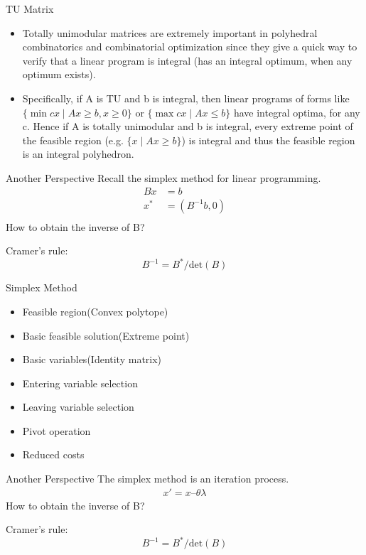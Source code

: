     \begin{frame}{TU Matrix}
      \begin{itemize}
        \item Totally unimodular matrices are extremely important in polyhedral combinatorics and combinatorial optimization since they give a quick way to verify that a linear program is integral (has an integral optimum, when any optimum exists).
        \item Specifically, if A is TU and b is integral, then linear programs of forms like $ \{\min cx\mid Ax\geq b,x\geq 0\} $ or $ \{\max cx\mid Ax\leq b\} $ have integral optima, for any c. Hence if A is totally unimodular and b is integral, every extreme point of the feasible region (e.g. $ \{x\mid Ax\geq b\} $) is integral and thus the feasible region is an integral polyhedron.
      \end{itemize}
    \end{frame}

    \begin{frame}{Another Perspective}
      Recall the simplex method for linear programming.
      \begin{equation*}
        \begin{align}
        Bx &= b \\
        x^* &= (B^{-1}b,0) \\
        \end{align}
      \end{equation*}
      How to obtain the inverse of B?

      Cramer's rule: \[B^{-1} = B^*/\text{det}(B)\]
    \end{frame}

    \begin{frame}{Simplex Method}
      \begin{itemize}
        \item Feasible region(Convex polytope)
        \item Basic feasible solution(Extreme point)
        \item Basic variables(Identity matrix)
        \item Entering variable selection
        \item Leaving variable selection
        \item Pivot operation
        \item Reduced costs
      \end{itemize}
    \end{frame}

    \begin{frame}{Another Perspective}
      The simplex method is an iteration process.
      \begin{equation*}
        \begin{align}
        x' = x – \theta\lambda
        \end{align}
      \end{equation*}
      How to obtain the inverse of B?
      \begin{block}
        {Cramer's rule:}
        {\centering\[B^{-1} = B^*/\text{det}(B)\]}
      \end{block}
    \end{frame}

